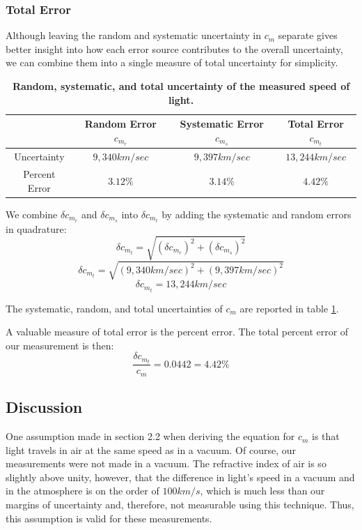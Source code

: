 \documentclass[twocolumn]{article}
\begin{document}
		
		\subsubsection{Total Error} \label{subsubsec:TotalError}
		Although leaving the random and systematic uncertainty in $c_m$ separate gives better insight into how each error source contributes to the overall uncertainty, we can combine them into a single measure of total uncertainty for simplicity.
		
		\begin{table}[!ht]
			\centering
			\begin{tabular}{c|c c c}
				&	Random Error $c_{m_r}$	& Systematic Error $c_{m_s}$	& Total Error $c_{m_t}$	\\ \hline
				Uncertainty	&	$9,340 km/sec$	& $9,397 km/sec$	&	$13,244 km/sec$	\\
				Percent Error	&	$3.12\%$	&	$3.14\%$	&	$4.42\%$	\\
			\end{tabular}
			\caption{\textbf{Random, systematic, and total uncertainty of the measured speed of light.}}
			\label{tab:Uncertainties}
		\end{table}
		
		We combine $\delta c_{m_r}$ and $\delta c_{m_s}$ into $\delta c_{m_t}$ by adding the systematic and random errors in quadrature:
		\begin{equation}
			\delta c_{m_t} = \sqrt{ \left(\delta c_{m_r} \right)^2 + \left( \delta c_{m_s} \right)^2}
		\end{equation}
		\begin{equation}
		\delta c_{m_t} = \sqrt{ \left( 9,340 km/sec \right)^2 + \left(  9,397 km/sec \right)^2}
		\end{equation}
		\begin{equation}
			\delta c_{m_t} = 13,244 km/sec
		\end{equation}
		
		The systematic, random, and total uncertainties of $c_m$ are reported in table \ref{tab:Uncertainties}.
		
		A valuable measure of total error is the percent error.
		The total percent error of our measurement is then:
		\begin{equation}
			\frac{\delta c_{m_t}}{c_m} = 0.0442 = 4.42\% 
		\end{equation}
		
	\subsection{Discussion}
		One assumption made in section 2.2 when deriving the equation for $c_m$ is that light travels in air at the same speed as in a vacuum. 
		Of course, our measurements were not made in a vacuum.
		The refractive index of air is so slightly above unity, however, that the difference in light's speed in a vacuum and in the atmosphere is on the order of $100 km/s$, which is much less than our margins of uncertainty and, therefore, not measurable using this technique.
		Thus, this assumption is valid for these measurements.
		
\end{document}
